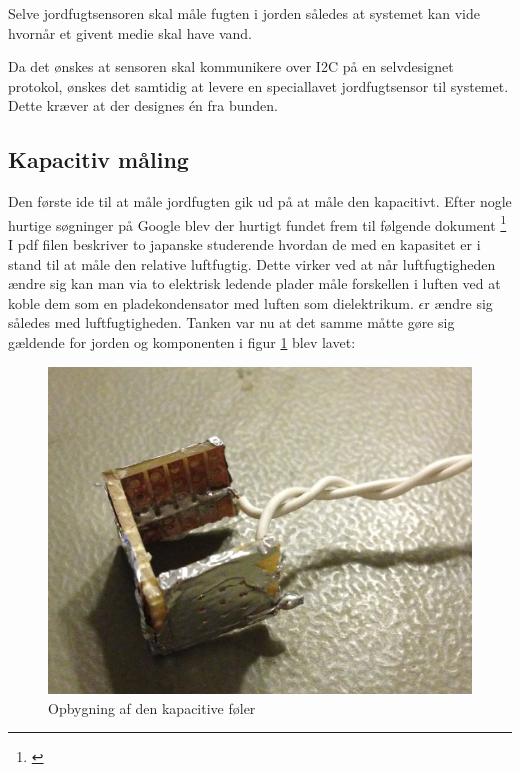 Selve jordfugtsensoren skal måle fugten i jorden således at systemet kan vide hvornår et givent medie skal have vand. 

Da det ønskes at sensoren skal kommunikere over I2C på en selvdesignet protokol, ønskes det samtidig at levere en speciallavet jordfugtsensor til systemet. Dette kræver at der designes én fra bunden.\newline 

\subsection{Kapacitiv måling}
Den første ide til at måle jordfugten gik ud på at måle den kapacitivt. Efter nogle hurtige søgninger på Google blev der hurtigt fundet frem til følgende dokument \footnote{\citet{transem:humiditysensor}}
I pdf filen beskriver to japanske studerende hvordan de med en kapasitet er i stand til at måle den relative luftfugtig. Dette virker ved at når luftfugtigheden ændre sig kan man via to elektrisk ledende plader måle forskellen i luften ved at koble dem som en pladekondensator med luften som dielektrikum. 
$\epsilon$r ændre sig således med luftfugtigheden. Tanken var nu at det samme måtte gøre sig gældende for jorden og komponenten i figur \ref{photo:Kapsitiv_foeler} blev lavet:

\begin{figure}[H]
	\centering 
	\includegraphics[scale=0.1]{HardwareArkitektur/Sensore/Jordfugt_billeder/Kapacitiv_foler.JPG}
	\caption{Opbygning af den kapacitive f$\text{ø}$ler}
	\label{photo:Kapsitiv_foeler}
\end{figure}

